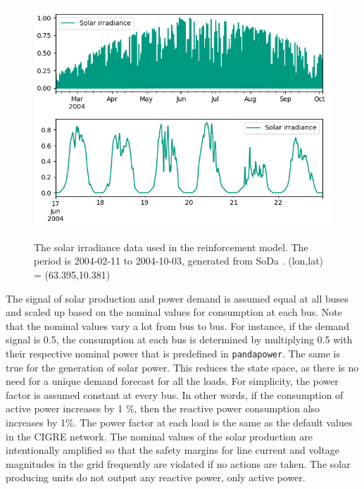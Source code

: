 \documentclass[class=book, crop=false, 11pt]{standalone}
\begin{document}
\begin{figure}[ht]
    \center
    \includegraphics[height=9cm, width=13.5cm]{figures/solar_data.png}
    \caption[size = 9]{The solar irradiance data used in the reinforcement model. The period is 2004-02-11 to 2004-10-03, generated from SoDa \cite{solar_data}. (lon,lat) = (63.395,10.381) }
    \label{fig:problem:solar_data}
\end{figure}


The signal of solar production and power demand is assumed equal at all buses and scaled up based on the nominal values for consumption at each bus. Note that the nominal values vary a lot from bus to bus. For instance, if the demand signal is 0.5, the consumption at each bus is determined by multiplying 0.5 with their respective nominal power that is predefined in \texttt{pandapower}. The same is true for the generation of solar power. This reduces the state space, as there is no need for a unique demand forecast for all the loads.  For simplicity, the power factor is assumed constant at every bus. In other words, if the consumption of active power increases by 1 \%, then the reactive power consumption also increases by 1\%. The power factor at each load is the same as the default values in the CIGRE network. The nominal values of the solar production are intentionally amplified so that the safety margins for line current and voltage magnitudes in the grid frequently are violated if no actions are taken. The solar producing units do not output any reactive power, only active power.
\end{document}
